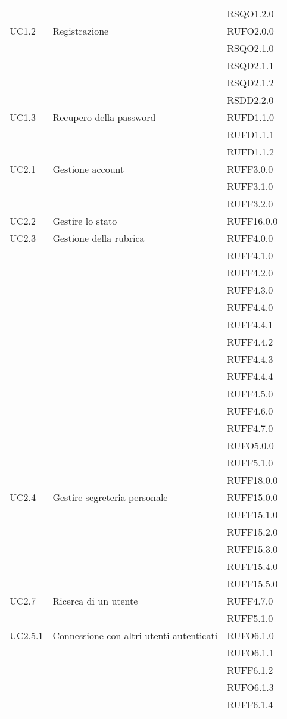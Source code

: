 \begin{center}
\begin{longtable}{lp{}l}
 &  & RSQO1.2.0 \\
UC1.2 & Registrazione & RUFO2.0.0 \\
 &  & RSQO2.1.0 \\
 &  & RSQD2.1.1 \\
 &  & RSQD2.1.2 \\
 &  & RSDD2.2.0 \\
UC1.3 & Recupero della password & RUFD1.1.0 \\
 &  & RUFD1.1.1 \\
 &  & RUFD1.1.2 \\
UC2.1 & Gestione account & RUFF3.0.0 \\
 &  & RUFF3.1.0 \\
 &  & RUFF3.2.0 \\
UC2.2 & Gestire lo stato & RUFF16.0.0 \\
UC2.3 & Gestione della rubrica & RUFF4.0.0 \\
 &  & RUFF4.1.0 \\
 &  & RUFF4.2.0 \\
 &  & RUFF4.3.0 \\
 &  & RUFF4.4.0 \\
 &  & RUFF4.4.1 \\
 &  & RUFF4.4.2 \\
 &  & RUFF4.4.3 \\
 &  & RUFF4.4.4 \\
 &  & RUFF4.5.0 \\
 &  & RUFF4.6.0 \\
 &  & RUFF4.7.0 \\
 &  & RUFO5.0.0 \\
 &  & RUFF5.1.0 \\
 &  & RUFF18.0.0 \\
UC2.4 & Gestire segreteria personale & RUFF15.0.0 \\
 &  & RUFF15.1.0 \\
 &  & RUFF15.2.0 \\
 &  & RUFF15.3.0 \\
 &  & RUFF15.4.0 \\
 &  & RUFF15.5.0 \\
UC2.7 & Ricerca di un utente & RUFF4.7.0 \\
 &  & RUFF5.1.0 \\
UC2.5.1 & Connessione con altri utenti autenticati & RUFO6.1.0 \\
 &  & RUFO6.1.1 \\
 &  & RUFF6.1.2 \\
 &  & RUFO6.1.3 \\
 &  & RUFF6.1.4 \\

\end{longtable}
\end{center}

